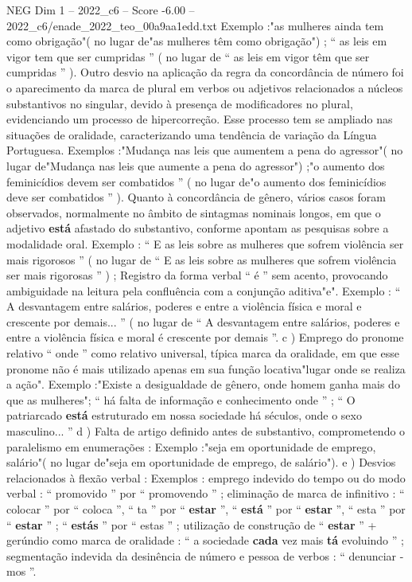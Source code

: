 \begin{textsample}{NEG Dim 1 – 2022\_c6 – Score -6.00 – 2022\_c6/enade\_2022\_teo\_00a9aa1edd.txt}
Exemplo :"as mulheres ainda tem como obrigação"( no lugar de"as mulheres têm como obrigação") ; “ as leis em vigor tem que ser cumpridas ” ( no lugar de “ as leis em vigor têm que ser cumpridas ” ).
Outro desvio na aplicação da regra da concordância de número foi o aparecimento da marca de plural em verbos ou adjetivos relacionados a núcleos substantivos no singular, devido à presença de modificadores no plural, evidenciando um processo de hipercorreção.
Esse processo tem se ampliado nas situações de oralidade, caracterizando uma tendência de variação da Língua Portuguesa.
Exemplos :"Mudança nas leis que aumentem a pena do agressor"( no lugar de"Mudança nas leis que aumente a pena do agressor") ;"o aumento dos feminicídios devem ser combatidos ” ( no lugar de"o aumento dos feminicídios deve ser combatidos ” ).
Quanto à concordância de gênero, vários casos foram observados, normalmente no âmbito de sintagmas nominais longos, em que o adjetivo \textbf{está} afastado do substantivo, conforme apontam as pesquisas sobre a modalidade oral.
Exemplo : “ E as leis sobre as mulheres que sofrem violência ser mais rigorosos ” ( no lugar de “ E as leis sobre as mulheres que sofrem violência ser mais rigorosas ” ) ; Registro da forma verbal “ é ” sem acento, provocando ambiguidade na leitura pela confluência com a conjunção aditiva"e".
Exemplo : “ A desvantagem entre salários, poderes e entre a violência física e moral e crescente por demais... ” ( no lugar de “ A desvantagem entre salários, poderes e entre a violência física e moral é crescente por demais ”. c ) Emprego do pronome relativo “ onde ” como relativo universal, típica marca da oralidade, em que esse pronome não é mais utilizado apenas em sua função locativa"lugar onde se realiza a ação".
Exemplo :"Existe a desigualdade de gênero, onde homem ganha mais do que as mulheres"; “ há falta de informação e conhecimento onde ” ; “ O patriarcado \textbf{está} estruturado em nossa sociedade há séculos, onde o sexo masculino... ” d ) Falta de artigo definido antes de substantivo, comprometendo o paralelismo em enumerações : Exemplo :"seja em oportunidade de emprego, salário"( no lugar de"seja em oportunidade de emprego, de salário"). e ) Desvios relacionados à flexão verbal : Exemplos : emprego indevido do tempo ou do modo verbal : “ promovido ” por “ promovendo ” ; eliminação de marca de infinitivo : “ colocar ” por “ coloca ”, “ ta ” por “ \textbf{estar} ”, “ \textbf{está} ” por “ \textbf{estar} ”, “ esta ” por “ \textbf{estar} ” ; “ \textbf{estás} ” por “ estas ” ; utilização de construção de “ \textbf{estar} ” + gerúndio como marca de oralidade : “ a sociedade \textbf{cada} vez mais \textbf{tá} evoluindo ” ; segmentação indevida da desinência de número e pessoa de verbos : “ denunciar -mos ”.

\end{textsample}
